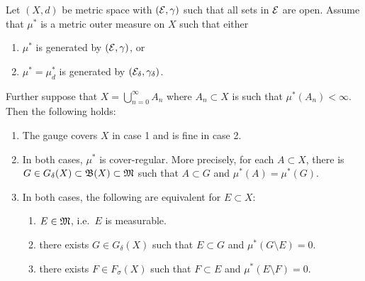 \documentclass[a4paper]{article}
\renewcommand{\cupinfn}{\bigcup_{n=0}^\infty}
\begin{document}
\begin{thm}
  Let $(X, d)$ be metric space with $(\mathcal{E}, \gamma)$ such that all sets
  in $\mathcal{E}$ are open. Assume that $\mu^*$ is a metric outer measure on
  $X$ such that either

  \begin{enumerate}
    \item $\mu^*$ is generated by $(\mathcal{E}, \gamma)$, or
    \item $\mu^* = \mu^*_d$ is generated by $(\mathcal{E}_\delta,
            \gamma_\delta)$.
  \end{enumerate}

  Further suppose that $X = \cupinfn A_n$ where $A_n \subset X$ is such
  that $\mu^*(A_n) < \infty$. Then the following holds:

  \begin{enumerate}
    \item The gauge covers $X$ in case 1 and is fine in case 2.
    \item In both cases, $\mu^*$ is cover-regular. More precisely, for
          each $A \subset X$, there is $G \in G_\delta(X) \subset \mathfrak{B}(X)
          \subset \mathfrak{M}$ such that $A \subset G$ and $\mu^*(A) = \mu^*(G)$.
    \item In both cases, the following are equivalent for $E \subset X$:
          \begin{enumerate}
            \item $E \in \mathfrak{M}$, i.e.\ $E$ is measurable.
            \item there exists $G \in G_\delta(X)$ such that $E \subset G$
                  and $\mu^*(G \setminus E) = 0$.
            \item there exists $F \in F_\sigma(X)$ such that $F \subset E$
                  and $\mu^* (E \setminus F) = 0$.
          \end{enumerate}
  \end{enumerate}
\end{thm}
\end{document}
